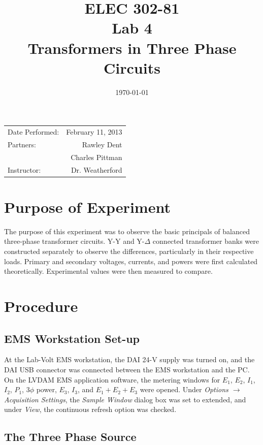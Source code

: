 \documentclass{article}
\title{ELEC 302-81\\ Lab 4\\ Transformers in Three Phase Circuits}
\date{\today}
\begin{document}
\maketitle

\begin{center}
  \begin{tabular}{lr}
    Date Performed: & February 11, 2013 \\
    Partners: & Rawley Dent \\
              & Charles Pittman \\
    Instructor: & Dr. Weatherford
  \end{tabular}
\end{center}

\pagebreak

\setlength\parindent{0pt}

\section{Purpose of Experiment}

The purpose of this experiment was to observe the basic principals of balanced
three-phase transformer circuits. Y-Y and Y-$\Delta$ connected transformer
banks were constructed separately to observe the differences, particularly in
their respective loads. Primary and secondary voltages, currents, and powers
were first calculated theoretically. Experimental values were then measured to
compare.

\section{Procedure}

\subsection{EMS Workstation Set-up}

At the Lab-Volt EMS workstation, the DAI 24-V supply was turned on, and the DAI
USB connector was connected between the EMS workstation and the {PC}. On the
LVDAM EMS application software, the metering windows for $E_1$, $E_2$, $I_1$,
$I_2$, $P_1$, 3$\phi$ power, $E_3$, $I_3$, and $E_1 + E_2 + E_3$ were
opened.  Under \emph{Options $\to$ Acquisition Settings}, the \emph{Sample
Window} dialog box was set to extended, and under \emph{View}, the
continuous refresh option was checked.

\subsection{The Three Phase Source}
\end{document}
